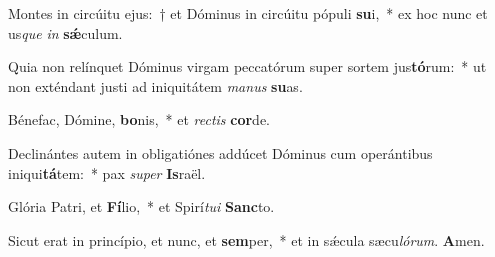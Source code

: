 Montes in circúitu ejus:~† et Dóminus in circúitu pópuli \textbf{su}i,~* ex hoc nunc et us\textit{que} \textit{in} \textbf{sǽ}culum.

Quia non relínquet Dóminus virgam peccatórum super sortem jus\textbf{tó}rum:~* ut non exténdant justi ad iniquitátem \textit{ma}\textit{nus} \textbf{su}as.

Bénefac, Dómine, \textbf{bo}nis,~* et \textit{rec}\textit{tis} \textbf{cor}de.

Declinántes autem in obligatiónes addúcet Dóminus cum operántibus iniqui\textbf{tá}tem:~* pax \textit{su}\textit{per} \textbf{Is}raël.

Glória Patri, et \textbf{Fí}lio,~* et Spirí\textit{tu}\textit{i} \textbf{Sanc}to.

Sicut erat in princípio, et nunc, et \textbf{sem}per,~* et in sǽcula sæcu\textit{ló}\textit{rum}. \textbf{A}men.

